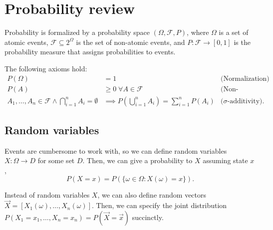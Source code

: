\section{Probability review} \label{sec:prob-review}

Probability is formalized by a probability space $(\Omega, \mathcal{F}, P)$,
where $\Omega$ is a set of atomic events, $\mathcal{F} \subseteq 2^\Omega$ is
the set of non-atomic events, and $P: \mathcal{F}\to [0,1]$ is the
probability measure that assigns probabilities to events.

The following axioms hold:
\begin{align*}
    P(\Omega)                                                          & = 1                                                              & \text{(Normalization)}        \\
    P(A)                                                               & \geq 0 \;\forall A\in\mathcal{F}                                 & \text{(Non-negativity)}       \\
    A_1,\ldots,A_n\in\mathcal{F} \land \bigcap_{i=1}^n A_i = \emptyset & \implies P\left(\bigcup_{i=1}^n A_i\right) = \sum_{i=1}^n P(A_i) & \text{($\sigma$-additivity)}.
\end{align*}

\subsection{Random variables}

Events are cumbersome to work with, so we can define random variables
$X:\Omega\to D$ for some set $D$. Then, we can give a probability to $X$
assuming state $x$, \[
    P(X=x) = P(\{ \omega\in\Omega : X(\omega) = x \}).
\]

Instead of random variables $X$, we can also define random vectors
$\vec{X}=[X_1(\omega), \ldots, X_n(\omega)]$.  Then, we can specify the joint
distribution $P(X_1=x_1,\ldots,X_n=x_n)=P(\vec{X}=\vec{x})$ succinctly.

